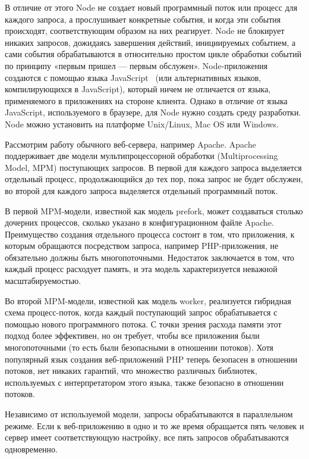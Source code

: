 В отличие от этого Node не создает новый программный поток или процесс для каждого запроса, а прослушивает конкретные события, и когда эти события происходят, соответствующим образом на них реагирует. Node не блокирует никаких запросов, дожидаясь завершения действий, инициируемых событием, а сами события обрабатываются в относительно простом цикле обработки событий по принципу «первым пришел — первым обслужен».
Node-приложения создаются с помощью языка JavaScript ~\cite{js}(или альтернативных языков, компилирующихся в JavaScript), который ничем не отличается от языка, применяемого в приложениях на стороне клиента. Однако в отличие от языка JavaScript, используемого в браузере, для Node нужно создать среду разработки. Node можно установить на платформе Unix/Linux, Mac OS или Windows.

Рассмотрим работу обычного веб-сервера, например Apache. Apache поддерживает две модели мультипроцессорной обработки (Multiprocessing Model, MPM) поступающих запросов. В первой для каждого запроса выделяется отдельный процесс, продолжающийся до тех пор, пока запрос не будет обслужен, во второй для каждого запроса выделяется отдельный программный поток.

В первой MPM-модели, известной как модель prefork, может создаваться столько дочерних процессов, сколько указано в конфигурационном файле Apache. Преимущество создания отдельного процесса состоит в том, что приложения, к которым обращаются посредством запроса, например PHP-приложения, не обязательно должны быть многопоточными. Недостаток заключается в том, что каждый процесс расходует память, и эта модель характеризуется неважной масштабируемостью.

Во второй MPM-модели, известной как модель worker, реализуется гибридная схема процесс-поток, когда каждый поступающий запрос обрабатывается с помощью нового программного потока. С точки зрения расхода памяти этот подход более эффективен, но он требует, чтобы все приложения были многопоточными (то есть были безопасными в отношении потоков). Хотя популярный язык создания веб-приложений PHP теперь безопасен в отношении потоков, нет никаких гарантий, что множество различных библиотек, используемых с интерпретатором этого языка, также безопасно в отношении потоков.

Независимо от используемой модели, запросы обрабатываются в параллельном режиме. Если к веб-приложению в одно и то же время обращается пять человек и сервер имеет соответствующую настройку, все пять запросов обрабатываются одновременно.

